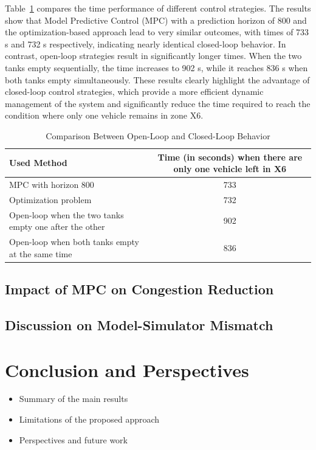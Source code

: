 \documentclass[12pt]{article}
\begin{document}
Table~\ref{tab:tableComparisonOL_MPC} compares the time performance of different control strategies. The results show that Model Predictive Control (MPC) with a prediction horizon of 800 and the optimization-based approach lead to very similar outcomes, with times of 733 s and 732 s respectively, indicating nearly identical closed-loop behavior. In contrast, open-loop strategies result in significantly longer times. When the two tanks empty sequentially, the time increases to 902 s, while it reaches 836 s when both tanks empty simultaneously. These results clearly highlight the advantage of closed-loop control strategies, which provide a more efficient dynamic management of the system and significantly reduce the time required to reach the condition where only one vehicle remains in zone X6.
\begin{table}[H]
    \centering
    \begin{tabularx}{\textwidth}{|X|c|}
        \hline
        \rowcolor{gray!20}
        Used Method & Time (in seconds) when there are only one vehicle left in X6 \\ \hline
        MPC with horizon 800 & 733 \\ \hline
        Optimization problem & 732 \\ \hline
        Open-loop when the two tanks empty one after the other & 902 \\ \hline
        Open-loop when both tanks empty at the same time & 836 \\ \hline
    \end{tabularx}
    \caption{Comparison Between Open-Loop and Closed-Loop Behavior}
    \label{tab:tableComparisonOL_MPC}
\end{table}

\subsection{Impact of MPC on Congestion Reduction}
\subsection{Discussion on Model-Simulator Mismatch}

\section{Conclusion and Perspectives}
\begin{itemize}
    \item Summary of the main results
    \item Limitations of the proposed approach
    \item Perspectives and future work
\end{itemize}

\newpage
\listoffigures
\end{document}
